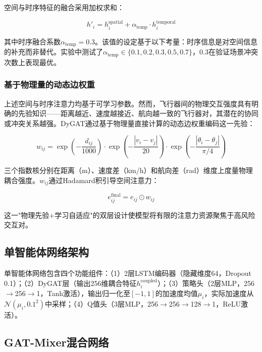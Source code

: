 \documentclass[12pt,a4paper,UTF8]{ctexart}
\begin{document}
空间与时序特征的融合采用加权求和：

\begin{equation}
    h'_i = h_i^{\text{spatial}} + \alpha_{\text{temp}} \cdot h_i^{\text{temporal}}
\end{equation}

其中时序融合系数$\alpha_{\text{temp}} = 0.3$。该值的设定基于以下考量：时序信息是对空间信息的补充而非替代。实验中测试了$\alpha_{\text{temp}} \in \{0.1, 0.2, 0.3, 0.5, 0.7\}$，0.3在验证场景冲突次数上表现最优。

\subsubsection{基于物理量的动态边权重}

上述空间与时序注意力均基于可学习参数。然而，飞行器间的物理交互强度具有明确的先验知识——距离越近、速度越接近、航向越一致的飞行器对，其潜在的协同或冲突关系越强。DyGAT通过基于物理量直接计算的动态边权重编码这一先验：

\begin{equation}
    w_{ij} = \exp\left(-\frac{d_{ij}}{1000}\right) \cdot \exp\left(-\frac{|v_i - v_j|}{20}\right) \cdot \exp\left(-\frac{|\theta_i - \theta_j|}{\pi/4}\right)
\end{equation}

三个指数核分别在距离（m）、速度差（km/h）和航向差（rad）维度上度量物理耦合强度。$w_{ij}$通过Hadamard积引导空间注意力：

\begin{equation}
    e_{ij}^{\text{final}} = e_{ij} \odot w_{ij}
\end{equation}

这一"物理先验$+$学习自适应"的双层设计使模型将有限的注意力资源聚焦于高风险交互对。

\subsection{单智能体网络架构}

单智能体网络包含四个功能组件：（1）2层LSTM编码器（隐藏维度64，Dropout 0.1）；（2）DyGAT层（输出256维耦合特征$h_i^{\text{coupled}}$）；（3）策略头（2层MLP，256$\to$256$\to$1，Tanh激活），输出归一化至$[-1, 1]$的加速度均值$\mu_i$，实际加速度从$\mathcal{N}(\mu_i, 0.1^2)$中采样；（4）Q值头（3层MLP，256$\to$256$\to$128$\to$1，ReLU激活）。

\subsection{GAT-Mixer混合网络}
\end{document}

